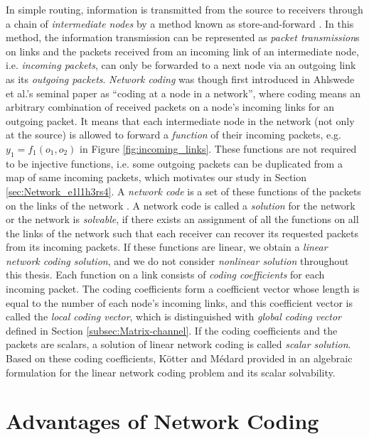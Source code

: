 In simple routing, information is transmitted from the source to receivers
through a chain of \textit{intermediate nodes} by a method known as
store-and-forward \cite{Yeung:2006}. In this method, the information
transmission can be represented as \textit{packet transmission}s on
links and the packets received from an incoming link of an intermediate
node, i.e. \textit{incoming packets}, can only be forwarded to a next
node via an outgoing link as its \textit{outgoing packets}. \textit{Network
coding} was though first introduced in Ahlswede et al.'s seminal paper
\cite{Ahlswede:2000} as ``coding at a node in a network'', where
coding means an arbitrary combination of received packets on a node's
incoming links for an outgoing packet. It means that each intermediate
node in the network (not only at the source) is allowed to forward
a \textit{function} of their incoming packets, e.g. $y_{1}=f_{1}(o_{1},o_{2})$
in Figure \ref{fig:incoming_links}. These functions are not required
to be injective functions, i.e. some outgoing packets can be duplicated
from a map of same incoming packets, which motivates our study in
Section \ref{sec:Network_e1l1h3rs4}. A \textit{network code} is a
set of these functions of the packets on the links of the network
\cite{Wachter-Zeh:2018}. A network code is called a \textit{solution}
for the network or the network is \textit{solvable}, if there exists
an assignment of all the functions on all the links of the network
such that each receiver can recover its requested packets from its
incoming packets. If these functions are linear, we obtain a \textit{linear
network coding solution}, and we do not consider \textit{nonlinear
solution} throughout this thesis. Each function on a link consists
of \textit{coding coefficients} for each incoming packet. The coding
coefficients form a coefficient vector whose length is equal to the
number of each node's incoming links, and this coefficient vector
is called the \textit{local coding vector}, which is distinguished
with \textit{global coding vector} defined in Section \ref{subsec:Matrix-channel}.
If the coding coefficients and the packets are scalars, a solution
of linear network coding is called \textit{scalar solution}. Based
on these coding coefficients, Kötter and M\'edard provided in \cite{Koetter:2003}
an algebraic formulation for the linear network coding problem and
its scalar solvability.

\section{Advantages of Network Coding \label{sec:Advantages-of-NC}}

